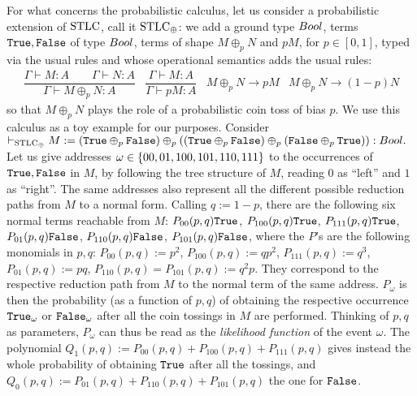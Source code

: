 For what concerns the probabilistic calculus, let us consider a probabilistic extension of $\mathrm{STLC}$, call it $\mathrm{STLC}_\oplus$:
we add a ground type $\bool$, terms $\mathtt{True},\mathtt{False}$ of type $\bool$, terms of shape $M\oplus_p N$ and $pM$, for $p\in[0,1]$, typed via the usual rules and whose operational semantics adds the usual rules:
{\small{\[\begin{array}{cccc}
           \dfrac{\Gamma\vdash M:A \qquad \Gamma\vdash N:A}{\Gamma\vdash M\oplus_p N:A}
           &
           \dfrac{\Gamma\vdash M:A}{\Gamma\vdash pM:A}
           &
           M\oplus_p N \to pM
           &
           M\oplus_p N \to (1-p)N
          \end{array}\]}}
so that $M\oplus_p N$ plays the role of a probabilistic coin toss of bias $p$.
We use this calculus as a toy example for our purposes.
Consider %
$
 \vdash_{\STLC_\oplus} M:=(\true \oplus_p\false)\oplus_p((\true\oplus_p\false)\oplus_p(\false\oplus_p\true)):\bool.
 $
Let us give addresses $\omega\in\{00,01,100,101,110,111\}$ to the occurrences of $\mathtt{True},\mathtt{False}$ in $M$, by following the tree structure of $M$, reading $0$ as ``left'' and $1$ as ``right''.
The same addresses also represent all the different possible reduction paths from $M$ to a normal form.
Calling $q:=1-p$, there are the following six normal terms reachable from $M$:
$P_{00}(p,q)\mathtt{True}$, 
$P_{100}(p,q)\mathtt{True}$, 
$P_{111}(p,q)\mathtt{True}$, 
$P_{01}(p,q)\mathtt{False}$, 
$P_{110}(p,q)\mathtt{False}$,
$P_{101}(p,q)\mathtt{False}$,
where the $P$'s are the following monomials in $p,q$:
$P_{00}(p,q):=p^2$,
$P_{100}(p,q):=qp^2$,
$P_{111}(p,q):=q^3$,
$P_{01}(p,q):=pq$,
$P_{110}(p,q)=P_{101}(p,q):=q^2p$.
They correspond to the respective reduction path from $M$ to the normal term of the same address.
$P_{\omega}$ is then the probability (as a function of $p,q$) of obtaining the respective occurrence $\mathtt{True}_{\omega}$ or $\mathtt{False}_\omega$ after all the coin tossings in $M$ are performed.
Thinking of $p,q$ as parameters, $P_{\omega}$ can thus be read as the \emph{likelihood function} of the event $\omega$.
The polynomial $Q_{1}(p,q):=P_{00}(p,q)+P_{100}(p,q)+P_{111}(p,q)$ gives instead the whole probability of obtaining $\mathtt{True}$ after all the tossings, and $Q_{0}(p,q):=P_{01}(p,q)+P_{110}(p,q)+P_{101}(p,q)$ the one for $\mathtt{False}$.


